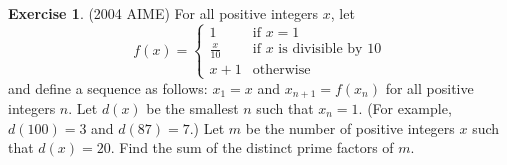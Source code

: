 \documentclass[letterpaper]{article}
\theoremstyle{remark}
\theoremstyle{definition}
\newtheorem{exercise}[thm]{Exercise}
\begin{document}
\begin{exercise}
(2004 AIME) For all positive integers $ x$, let
\[ f(x) = \begin{cases}1 & \text{if }x = 1 \\
\frac x{10} & \text{if }x\text{ is divisible by 10} \\
x + 1 & \text{otherwise}\end{cases}\]and define a sequence as follows: $ x_1 = x$ and $ x_{n + 1} = f(x_n)$ for all positive integers $ n$. Let $ d(x)$ be the smallest $ n$ such that $ x_n = 1$. (For example, $ d(100) = 3$ and $ d(87) = 7$.) Let $ m$ be the number of positive integers $ x$ such that $ d(x) = 20$. Find the sum of the distinct prime factors of $ m$.
\end{exercise}
\end{document}
